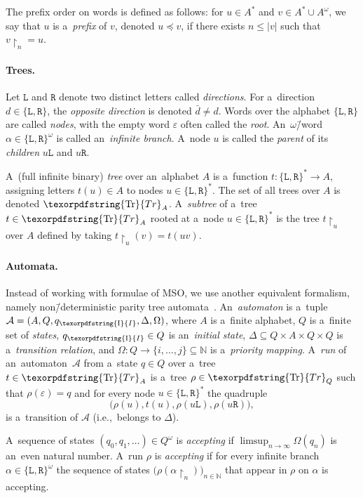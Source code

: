 \documentclass[11pt,a4paper]{amsart}
\theoremstyle{plain}
\theoremstyle{definition}
\theoremstyle{defC}
\theoremstyle{thmC}
\theoremstyle{plain}
\numberwithin{equation}{section}
\numberwithin{equation}{section}
\numberwithin{figure}{section}
\newcommand{\ident}[1]{\ensuremath{\texorpdfstring{\mathrm{\mathnm{#1}}}{#1}}\xspace}
\newcommand{\domain}[1]{\ensuremath{\mathbb{#1}}\xspace}
\newcommand{\N}{\domain{N}}
\newcommand{\mathcalsym}[1]{\ensuremath{\mathcal{#1}}\xspace}
\newcommand{\CA}{\mathcalsym{A}}
\newcommand{\from}{\colon}
\newcommand{\dL}{\mathtt{{\scriptstyle L}}}
\newcommand{\dR}{\mathtt{{\scriptstyle R}}}
\newcommand{\mathnm}[1]{#1}
\newcommand{\restr}{{\upharpoonright}}
\newcommand{\init}{\ident{I}}
\newcommand{\trees}{\ident{Tr}}
\renewcommand\epsilon\varepsilon
\begin{document}
The prefix order on words is defined as follows: for $u\in A^\ast$ and $v\in A^\ast\cup A^\omega$, we say that $u$ is a~\emph{prefix} of $v$, denoted $u\preceq v$, if there exists $n\leq |v|$ such that $v\restr_n = u$.


\paragraph*{Trees.}
Let $\dL$ and $\dR$ denote two distinct letters called \emph{directions}.
For a~direction $d\in\{\dL,\dR\}$, the \emph{opposite direction} is denoted $\bar{d}\neq d$.
Words over the alphabet $\{\dL,\dR\}$ are called \emph{nodes}, with the empty word $\epsilon$ often called the \emph{root}.
An~$\omega$\=/word $\alpha\in\{\dL,\dR\}^\omega$ is called an~\emph{infinite branch}.
A~node $u$ is called the \emph{parent} of its \emph{children} $u \dL$ and $u\dR$.

A~(full infinite binary) \emph{tree} over an~alphabet $A$ is a~function $t\from \{\dL,\dR\}^\ast\to A$, assigning letters $t(u)\in A$ to nodes $u\in\{\dL,\dR\}^\ast$.
The set of all trees over $A$ is denoted $\trees_A$.
A~\emph{subtree} of a~tree $t\in\trees_A$ rooted at a~node $u\in\{\dL,\dR\}^\ast$ is the tree $t\restr_u$ over $A$ defined by taking $t\restr_u(v) = t(uv)$.


\paragraph*{Automata.}
Instead of working with formulae of MSO, we use another equivalent formalism, namely non\=/deterministic parity tree automata~\cite{thomas_languages}.
An~\emph{automaton} is a~tuple $\CA=(A,Q, q_{\init}, \Delta,\Omega)$, where $A$ is a~finite alphabet, $Q$ is a~finite set of \emph{states}, $q_{\init}\in Q$ is an~\emph{initial state},
$\Delta\subseteq Q\times A\times Q\times Q$ is a~\emph{transition relation}, and $\Omega\from Q\to \{i,\ldots,j\}\subseteq \N$ is a~\emph{priority mapping}.
A~\emph{run} of an~automaton~$\CA$ from a~state $q\in Q$ over a~tree $t\in\trees_A$ is a~tree $\rho\in\trees_Q$ such that $\rho(\epsilon)=q$ and for every node $u\in\{\dL,\dR\}^\ast$ the quadruple
\[\big(\rho(u), t(u), \rho(u\dL),\rho(u \dR)\big),\]
is a~transition of $\CA$ (i.e.,~belongs to $\Delta$).

A~sequence of states $(q_0,q_1,\ldots)\in Q^\omega$ is \emph{accepting} if $\limsup_{n\to\infty} \Omega(q_n)$ is an~even natural number.
A~run $\rho$ is \emph{accepting} if for every infinite branch $\alpha\in\{\dL,\dR\}^\omega$ the sequence of states $\big(\rho(\alpha\restr_n)\big)_{n\in\N}$ that appear in $\rho$ on $\alpha$ is accepting.
\end{document}
